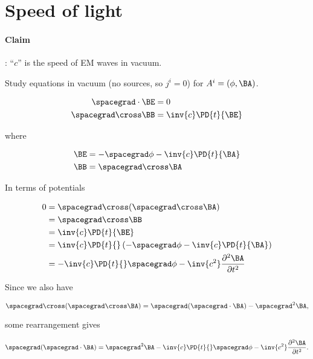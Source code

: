 \section{Speed of light}

\paragraph{Claim}: ``$c$'' is the speed of EM waves in vacuum.

Study equations in vacuum (no sources, so $j^i = 0$) for $A^i = (\phi, \BA)$.

\begin{align}\label{eqn:relativisticElectrodynamicsL13:430}
\spacegrad \cdot \BE &= 0 \\
\spacegrad \cross \BB &= \inv{c} \PD{t}{\BE}
\end{align}

where

\begin{align}\label{eqn:relativisticElectrodynamicsL13:450}
\BE &= - \spacegrad \phi - \inv{c} \PD{t}{\BA} \\
\BB &= \spacegrad \cross \BA
\end{align}

In terms of potentials

\begin{align*}
0 &= \spacegrad \cross (\spacegrad \cross \BA) \\
&= \spacegrad \cross \BB \\
&= \inv{c} \PD{t}{\BE} \\
&= \inv{c} \PD{t}{} \left( - \spacegrad \phi - \inv{c} \PD{t}{\BA} \right) \\
&= -\inv{c} \PD{t}{} \spacegrad \phi - \inv{c^2} \frac{\partial^2 \BA}{\partial t^2} 
\end{align*}

Since we also have

\begin{equation}\label{eqn:relativisticElectrodynamicsL13:600}
\spacegrad \cross (\spacegrad \cross \BA) = \spacegrad (\spacegrad \cdot \BA) - \spacegrad^2 \BA,
\end{equation}

some rearrangement gives

\begin{equation}\label{eqn:relativisticElectrodynamicsL13:600b}
\spacegrad (\spacegrad \cdot \BA) = \spacegrad^2 \BA  -\inv{c} \PD{t}{} \spacegrad \phi - \inv{c^2} \frac{\partial^2 \BA}{\partial t^2}.
\end{equation}

